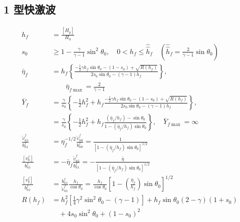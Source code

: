 \documentclass[10.5pt
]{article}
\begin{document}
\subsection{1 型快激波}
\begin{align}
h_f &= \frac{[H_y]}{H_0}
\\
s_0 &\ge 1 - \frac{\gamma}{\gamma-1} \sin^2\theta_0, \quad 0 < h_f \le \hat{\hat{h}}_f
\quad \left(\hat{\hat{h}}_f = \frac{2}{\gamma-1} \sin\theta_0\right)
\\
\bar{\eta}_f &= h_f \left\{\frac{-\frac{1}{2} \gamma h_f \sin\theta_0 - (1-s_0) +
\sqrt{R(h_f)}}{2s_0 \sin\theta_0 - (\gamma-1) h_f}\right\}, \nonumber\\
& \qquad \bar{\eta}_{f\max} = \frac{2}{\gamma-1}
\\
\bar{Y}_f &= \frac{\gamma}{s_0} \left\{-\frac{1}{2} h_f^2 + h_f \frac{-\frac{1}{2}
\gamma h_f \sin\theta_0 - (1-s_0) + \sqrt{R(h_f)}}{2s_0 \sin\theta_0 - (\gamma-1)
h_f}\right\}, \nonumber
\\
&= \frac{\gamma}{s_0} \left\{-\frac{1}{2} h_f^2 + h_f \frac{(\bar{\eta}_f/h_f) -
\sin\theta_0}{1 - (\bar{\eta}_f/h_f)\sin\theta_0}\right\}, \quad \bar{Y}_{f\max} = \infty
\\
\frac{\tilde{v}_{n1}^f}{b_{n1}^f} &= \eta_f^{-1/2} \frac{\tilde{v}_{n0}^f}{b_{n0}^f} =
\frac{1}{[1 - (\bar{\eta}_f/h_f) \sin\theta_0]^{1/2}}
\\
\frac{[v_n^f]}{b_{n1}^f} &= - \bar{\eta}_f \frac{\tilde{v}_{n1}^f}{b_{n1}^f} =
-\frac{\bar{\eta}}{[1 - (\bar{\eta}_f/h_f) \sin\theta_0]^{1/2}}
\\
\frac{[v_y^f]}{b_{n1}^f} &= \frac{b_{n1}^f}{\tilde{v}_{n1}^f} \frac{h_f}{\cos\theta_0}
= \frac{h_f}{\cos\theta_0} \left[1 - \left(\frac{\bar{\eta}_f}{h_f}\right)
\sin\theta_0\right]^{1/2}
\\
R(h_f) &= h_f^2 \left[\frac{1}{4} \gamma^2 \sin^2\theta_0 - (\gamma - 1)\right] + h_f
\sin\theta_0 (2 - \gamma) (1 + s_0)
\nonumber\\
& \quad + 4s_0 \sin^2\theta_0 + (1 - s_0)^2
\end{align}
\end{document}
